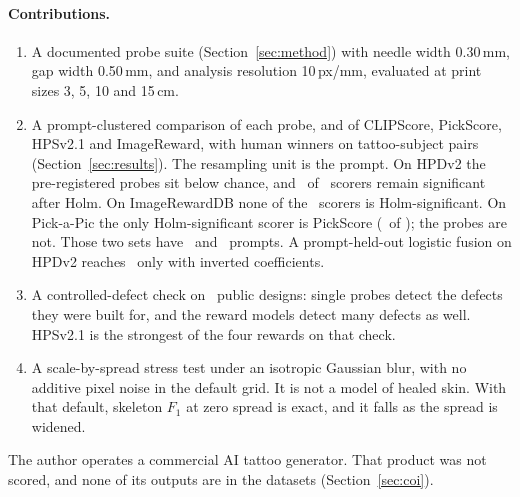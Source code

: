 \paragraph{Contributions.}
\begin{enumerate}
  \item A documented probe suite (Section~\ref{sec:method}) with needle width 0.30\,mm, gap width 0.50\,mm, and analysis resolution 10\,px/mm, evaluated at print sizes 3, 5, 10 and 15\,cm.
  \item A prompt-clustered comparison of each probe, and of CLIPScore, PickScore, HPSv2.1 and ImageReward, with human winners on tattoo-subject pairs (Section~\ref{sec:results}).
  The resampling unit is the prompt.
  On HPDv2 the pre-registered probes sit below chance, and \NHpdSigholm\ of \NHpdTests\ scorers remain significant after Holm.
  On ImageRewardDB none of the \NIrTests\ scorers is Holm-significant.
  On Pick-a-Pic the only Holm-significant scorer is PickScore (\NPapSigholm\ of \NPapTests); the probes are not.
  Those two sets have \NIrTsprompts\ and \NPapTsprompts\ prompts.
  A prompt-held-out logistic fusion on HPDv2 reaches \FusHpdProbespreregisteredAcc\ only with inverted coefficients.
  \item A controlled-defect check on \nDegrDesigns\ public designs: single probes detect the defects they were built for, and the reward models detect many defects as well.
  HPSv2.1 is the strongest of the four rewards on that check.
  \item A scale-by-spread stress test under an isotropic Gaussian blur, with no additive pixel noise in the default grid.
  It is not a model of healed skin.
  With that default, skeleton $F_1$ at zero spread is exact, and it falls as the spread is widened.
\end{enumerate}

The author operates a commercial AI tattoo generator.
That product was not scored, and none of its outputs are in the datasets (Section~\ref{sec:coi}).
